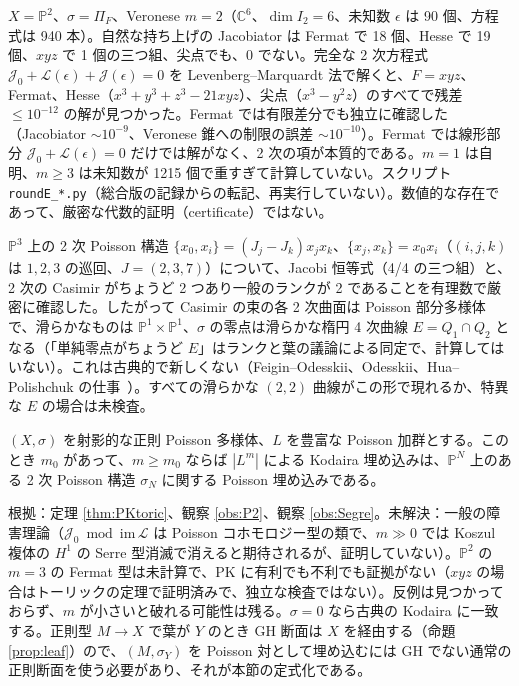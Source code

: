 \begin{obs}[$\mathbb P^2$、3 次式、$m=2$：数値的確認]\tV\label{obs:P2}
$X=\mathbb P^2$、$\sigma=\Pi_F$、Veronese $m=2$（$\mathbb C^6$、$\dim I_2=6$、未知数 $\epsilon$ は 90 個、方程式は 940 本）。自然な持ち上げの Jacobiator は Fermat で 18 個、Hesse で 19 個、$xyz$ で 1 個の三つ組、尖点でも、0 でない。完全な 2 次方程式 $\mathcal J_0+\mathcal L(\epsilon)+\mathcal J(\epsilon)=0$ を Levenberg--Marquardt 法で解くと、$F=xyz$、Fermat、Hesse（$x^3+y^3+z^3-21xyz$）、尖点（$x^3-y^2z$）のすべてで残差 $\le10^{-12}$ の解が見つかった。Fermat では有限差分でも独立に確認した（Jacobiator $\sim10^{-9}$、Veronese 錐への制限の誤差 $\sim10^{-10}$）。Fermat では線形部分 $\mathcal J_0+\mathcal L(\epsilon)=0$ だけでは解がなく、2 次の項が本質的である。$m=1$ は自明、$m\ge3$ は未知数が 1215 個で重すぎて計算していない。スクリプト \texttt{roundE\_*.py}（総合版の記録からの転記、再実行していない\tQ）。数値的な存在であって、厳密な代数的証明（certificate）ではない。
\end{obs}
\begin{obs}[$\mathbb P^1\times\mathbb P^1$ の Segre 埋め込み（$m=1$）：Sklyanin 型構造\ \tV]\label{obs:Segre}
$\mathbb P^3$ 上の 2 次 Poisson 構造 $\{x_0,x_i\}=(J_j-J_k)x_jx_k$、$\{x_j,x_k\}=x_0x_i$（$(i,j,k)$ は $1,2,3$ の巡回、$J=(2,3,7)$）について、Jacobi 恒等式（4/4 の三つ組）と、2 次の Casimir がちょうど 2 つあり一般のランクが 2 であることを有理数で厳密に確認した。したがって Casimir の束の各 2 次曲面は Poisson 部分多様体で、滑らかなものは $\mathbb P^1\times\mathbb P^1$、$\sigma$ の零点は滑らかな楕円 4 次曲線 $E=Q_1\cap Q_2$ となる（「単純零点がちょうど $E$」はランクと葉の議論による同定で、計算してはいない）。これは古典的で新しくない（Feigin--Odesskii、Odesskii、Hua--Polishchuk の仕事\tC\ \tQ）。すべての滑らかな $(2,2)$ 曲線がこの形で現れるか、特異な $E$ の場合は未検査\tK。
\end{obs}
\begin{conj}\tK\label{conj:PK}
$(X,\sigma)$ を射影的な正則 Poisson 多様体、$L$ を豊富な Poisson 加群とする。このとき $m_0$ があって、$m\ge m_0$ ならば $|L^m|$ による Kodaira 埋め込みは、$\mathbb P^N$ 上のある 2 次 Poisson 構造 $\sigma_N$ に関する Poisson 埋め込みである。
\end{conj}
\noindent 根拠：定理 \ref{thm:PKtoric}、観察 \ref{obs:P2}、観察 \ref{obs:Segre}。未解決：一般の障害理論（$\mathcal J_0\bmod\mathrm{im}\,\mathcal L$ は Poisson コホモロジー型の類で、$m\gg0$ では Koszul 複体の $H^1$ の Serre 型消滅で消えると期待されるが、証明していない）。$\mathbb P^2$ の $m=3$ の Fermat 型は未計算で、PK に有利でも不利でも証拠がない（$xyz$ の場合はトーリックの定理で証明済みで、独立な検査ではない）。反例は見つかっておらず、$m$ が小さいと破れる可能性は残る。$\sigma=0$ なら古典の Kodaira に一致する。正則型 $M\to X$ で葉が $Y$ のとき GH 断面は $X$ を経由する（命題 \ref{prop:leaf}）ので、$(M,\sigma_Y)$ を Poisson 対として埋め込むには GH でない通常の正則断面を使う必要があり、それが本節の定式化である。
